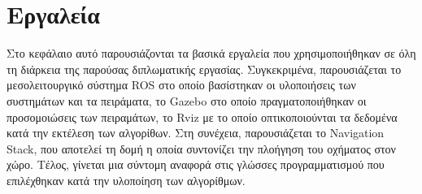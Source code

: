 \chapter{Εργαλεία}
\label{chapter:tools}

Στο κεφάλαιο αυτό παρουσιάζονται τα βασικά εργαλεία που
χρησιμοποιήθηκαν σε όλη τη διάρκεια της παρούσας διπλωματικής εργασίας. Συγκεκριμένα, παρουσιάζεται το μεσολειτουργικό σύστημα ROS στο οποίο βασίστηκαν οι υλοποιήσεις των συστημάτων και τα πειράματα, το Gazebo στο οποίο πραγματοποιήθηκαν οι προσομοιώσεις των πειραμάτων, το Rviz με το οποίο οπτικοποιούνται τα δεδομένα κατά την εκτέλεση των αλγορίθων. Στη συνέχεια, παρουσιάζεται το Navigation Stack, που αποτελεί τη δομή η οποία συντονίζει την πλοήγηση του οχήματος στον χώρο. Τέλος, γίνεται μια σύντομη αναφορά στις γλώσσες προγραμματισμού που επιλέχθηκαν κατά την υλοποίηση των αλγορίθμων.






